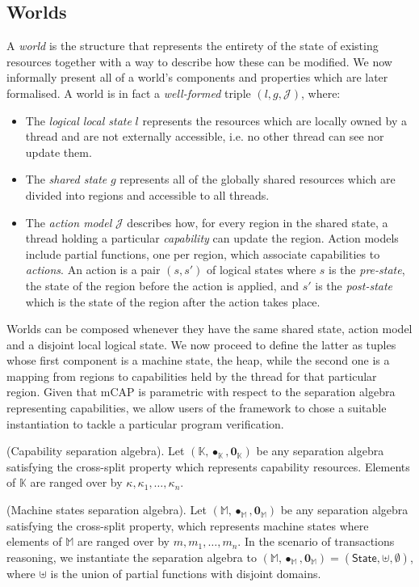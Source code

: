 \subsection{Worlds}

A \textit{world} is the structure that represents the entirety of the state of existing resources together with a way to describe how these can be modified. We now informally present all of a world's components and properties which are later formalised. A world is in fact a \textit{well-formed} triple $(l, g, \mathcal{J})$, where:
\begin{itemize}
	\item The \textit{logical local state} $l$ represents the resources which are locally owned by a thread and are not externally accessible, i.e. no other thread can see nor update them.
	\item The \textit{shared state} $g$ represents all of the globally shared resources which are divided into regions and accessible to all threads.
	\item The \textit{action model} $\mathcal{J}$ describes how, for every region in the shared state, a thread holding a particular \textit{capability} can update the region. Action models include partial functions, one per region, which associate capabilities to \textit{actions}. An action is a pair $(s, s')$ of logical states where $s$ is the \textit{pre-state}, the state of the region before the action is applied, and $s'$ is the \textit{post-state} which is the state of the region after the action takes place.
\end{itemize}

Worlds can be composed whenever they have the same shared state, action model and a disjoint local logical state. We now proceed to define the latter as tuples whose first component is a machine state, the heap, while the second one is a mapping from regions to capabilities held by the thread for that particular region. Given that mCAP is parametric with respect to the separation algebra representing capabilities, we allow users of the framework to chose a suitable instantiation to tackle a particular program verification.

\param (Capability separation algebra). Let $(\mathbb{K}, \bullet_\mathbb{K}, \mathbf{0}_\mathbb{K})$ be any separation algebra satisfying the cross-split property which represents capability resources. Elements of $\mathbb{K}$ are ranged over by $\kappa, \kappa_1, \ldots, \kappa_n$.

 (Machine states separation algebra). Let $(\mathbb{M}, \bullet_\mathbb{M}, \mathbf{0}_\mathbb{M})$ be any separation algebra satisfying the cross-split property, which represents machine states where elements of $\mathbb{M}$ are ranged over by $m, m_1, \ldots, m_n$. In the scenario of transactions reasoning, we instantiate the separation algebra to $(\mathbb{M}, \bullet_\mathbb{M}, \mathbf{0}_\mathbb{M}) = (\mathsf{State}, \uplus, \emptyset)$, where $\uplus$ is the union of partial functions with disjoint domains.

